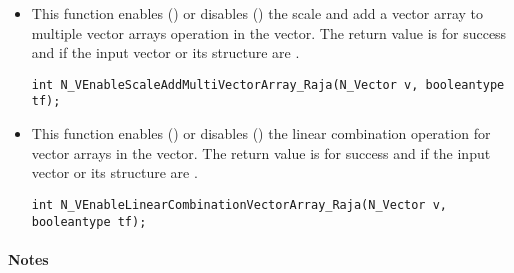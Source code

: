 \begin{itemize}




\item {}

This function enables () or disables () the scale and
add a vector array to multiple vector arrays operation in the {\raja} vector. The
return value is  for success and  if the input vector or its
 structure are .

\verb|int N_VEnableScaleAddMultiVectorArray_Raja(N_Vector v, booleantype tf);|


\item {}

This function enables () or disables () the linear
combination operation for vector arrays in the {\raja} vector. The return value
is  for success and  if the input vector or its  structure
are .

\verb|int N_VEnableLinearCombinationVectorArray_Raja(N_Vector v, booleantype tf);|

\end{itemize}
\paragraph{\bf Notes}

